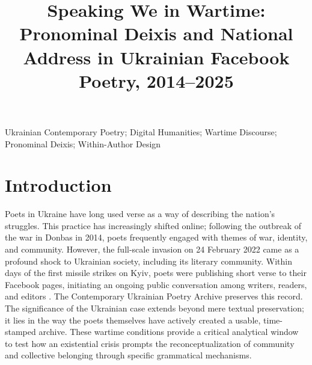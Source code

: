 \documentclass[12pt]{interact}
\theoremstyle{plain}%
\theoremstyle{definition}
\theoremstyle{remark}
\begin{document}

\title{Speaking We in Wartime: Pronominal Deixis and National Address in Ukrainian Facebook Poetry, 2014–2025}

\author{
}

\maketitle

\begin{abstract}

\end{abstract}

\begin{keywords}
Ukrainian Contemporary Poetry; Digital Humanities; Wartime Discourse; Pronominal Deixis; Within-Author Design
\end{keywords}

\section{Introduction}

Poets in Ukraine have long used verse as a way of describing the nation’s struggles. This practice has increasingly shifted online; following the outbreak of the war in Donbas in 2014, poets frequently engaged with themes of war, identity, and community. However, the full-scale invasion on 24 February 2022 came as a profound shock to Ukrainian society, including its literary community. Within days of the first missile strikes on Kyiv, poets were publishing short verse to their Facebook pages, initiating an ongoing public conversation among writers, readers, and editors \citep{glaser2024poetry}. The Contemporary Ukrainian Poetry Archive \citep{glaser2024archive} preserves this record. The significance of the Ukrainian case extends beyond mere textual preservation; it lies in the way the poets themselves have actively created a usable, time-stamped archive. These wartime conditions provide a critical analytical window to test how an existential crisis prompts the reconceptualization of community and collective belonging through specific grammatical mechanisms.
\end{document}
